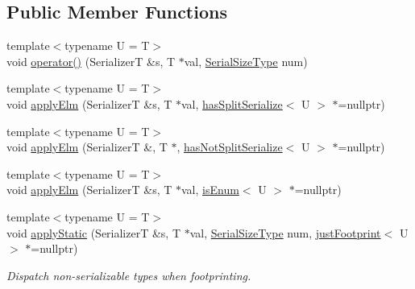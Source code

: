 \subsection*{Public Member Functions}
\begin{DoxyCompactItemize}
\item 
{\footnotesize template$<$typename U  = T$>$ }\\void \hyperlink{structcheckpoint_1_1dispatch_1_1_serializer_dispatch_non_byte_a6cf01feb8acb29ef56c37d3180b63671}{operator()} (SerializerT \&s, T $\ast$val, \hyperlink{namespacecheckpoint_a083f6674da3f94c2901b18c6d238217c}{Serial\+Size\+Type} num)
\item 
{\footnotesize template$<$typename U  = T$>$ }\\void \hyperlink{structcheckpoint_1_1dispatch_1_1_serializer_dispatch_non_byte_a3bbb12db16d00e1c76e51b52452187aa}{apply\+Elm} (SerializerT \&s, T $\ast$val, \hyperlink{structcheckpoint_1_1dispatch_1_1_serializer_dispatch_non_byte_a36fe4f2245004d2daa486a9e47b98b71}{has\+Split\+Serialize}$<$ U $>$ $\ast$=nullptr)
\item 
{\footnotesize template$<$typename U  = T$>$ }\\void \hyperlink{structcheckpoint_1_1dispatch_1_1_serializer_dispatch_non_byte_a9cf229e9134337734a8d8f06919b012c}{apply\+Elm} (SerializerT \&, T $\ast$, \hyperlink{structcheckpoint_1_1dispatch_1_1_serializer_dispatch_non_byte_a596c2f6081cc55d5ff0b7486f50b227b}{has\+Not\+Split\+Serialize}$<$ U $>$ $\ast$=nullptr)
\item 
{\footnotesize template$<$typename U  = T$>$ }\\void \hyperlink{structcheckpoint_1_1dispatch_1_1_serializer_dispatch_non_byte_a7cd7decd9c65f3f5d68a2e593275f8d1}{apply\+Elm} (SerializerT \&s, T $\ast$val, \hyperlink{structcheckpoint_1_1dispatch_1_1_serializer_dispatch_non_byte_ac47ded9971a3ed3d8d1824d1ff12031a}{is\+Enum}$<$ U $>$ $\ast$=nullptr)
\item 
{\footnotesize template$<$typename U  = T$>$ }\\void \hyperlink{structcheckpoint_1_1dispatch_1_1_serializer_dispatch_non_byte_a38d952156a857c4eba994db912725590}{apply\+Static} (SerializerT \&s, T $\ast$val, \hyperlink{namespacecheckpoint_a083f6674da3f94c2901b18c6d238217c}{Serial\+Size\+Type} num, \hyperlink{structcheckpoint_1_1dispatch_1_1_serializer_dispatch_non_byte_a162005f14e0a0cf2f3df64c2d9ec4d9e}{just\+Footprint}$<$ U $>$ $\ast$=nullptr)
\begin{DoxyCompactList}\small\item\em Dispatch non-\/serializable types when footprinting. \end{DoxyCompactList}\item 

\end{DoxyCompactItemize}
